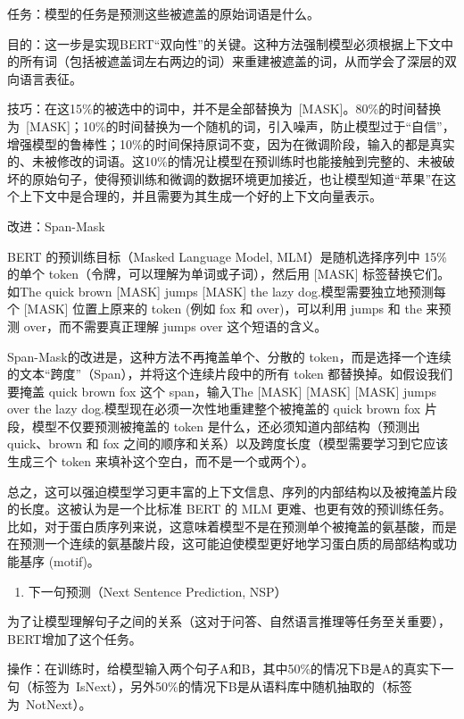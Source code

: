 任务：模型的任务是预测这些被遮盖的原始词语是什么。

目的：这一步是实现BERT``双向性''的关键。这种方法强制模型必须根据上下文中的所有词（包括被遮盖词左右两边的词）来重建被遮盖的词，从而学会了深层的双向语言表征。

技巧：在这15\%的被选中的词中，并不是全部替换为~{[}MASK{]}。80\%的时间替换为~{[}MASK{]}；10\%的时间替换为一个随机的词，引入噪声，防止模型过于``自信''，增强模型的鲁棒性；10\%的时间保持原词不变，因为在微调阶段，输入的都是真实的、未被修改的词语。这10\%的情况让模型在预训练时也能接触到完整的、未被破坏的原始句子，使得预训练和微调的数据环境更加接近，也让模型知道``苹果''在这个上下文中是合理的，并且需要为其生成一个好的上下文向量表示。

改进：Span-Mask

BERT 的预训练目标（Masked Language Model, MLM）是随机选择序列中 15\% 的单个 token（令牌，可以理解为单词或子词），然后用 {[}MASK{]} 标签替换它们。如The quick brown {[}MASK{]} jumps {[}MASK{]} the lazy dog.模型需要独立地预测每个 {[}MASK{]} 位置上原来的 token (例如 fox 和 over)，可以利用 jumps 和 the 来预测 over，而不需要真正理解 jumps over 这个短语的含义。

Span-Mask的改进是，这种方法不再掩盖单个、分散的 token，而是选择一个连续的文本``跨度''（Span），并将这个连续片段中的所有 token 都替换掉。如假设我们要掩盖 quick brown fox 这个 span，输入The {[}MASK{]} {[}MASK{]} {[}MASK{]} jumps over the lazy dog.模型现在必须一次性地重建整个被掩盖的 quick brown fox 片段，模型不仅要预测被掩盖的 token 是什么，还必须知道内部结构（预测出 quick、brown 和 fox 之间的顺序和关系）以及跨度长度（模型需要学习到它应该生成三个 token 来填补这个空白，而不是一个或两个）。

总之，这可以强迫模型学习更丰富的上下文信息、序列的内部结构以及被掩盖片段的长度。这被认为是一个比标准 BERT 的 MLM 更难、也更有效的预训练任务。比如，对于蛋白质序列来说，这意味着模型不是在预测单个被掩盖的氨基酸，而是在预测一个连续的氨基酸片段，这可能迫使模型更好地学习蛋白质的局部结构或功能基序 (motif)。

\begin{enumerate}
\def\labelenumi{\arabic{enumi}.}
\setcounter{enumi}{1}
\tightlist
\item
  下一句预测（Next Sentence Prediction, NSP）
\end{enumerate}

为了让模型理解句子之间的关系（这对于问答、自然语言推理等任务至关重要），BERT增加了这个任务。

操作：在训练时，给模型输入两个句子A和B，其中50\%的情况下B是A的真实下一句（标签为~IsNext），另外50\%的情况下B是从语料库中随机抽取的（标签为~NotNext）。

